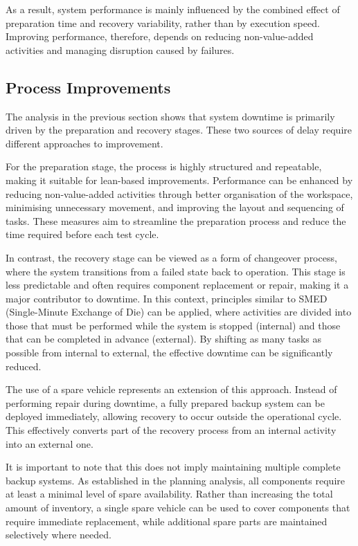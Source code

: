 \documentclass[11pt, a4paper]{report}
\numberwithin{equation}{section}
\begin{document}
As a result, system performance is mainly influenced by the combined effect of preparation time and recovery variability, rather than by execution speed. Improving performance, therefore, depends on reducing non-value-added activities and managing disruption caused by failures.

\subsection{Process Improvements}

The analysis in the previous section shows that system downtime is primarily driven by the preparation and recovery stages. These two sources of delay require different approaches to improvement.

For the preparation stage, the process is highly structured and repeatable, making it suitable for lean-based improvements. Performance can be enhanced by reducing non-value-added activities through better organisation of the workspace, minimising unnecessary movement, and improving the layout and sequencing of tasks. These measures aim to streamline the preparation process and reduce the time required before each test cycle.

In contrast, the recovery stage can be viewed as a form of changeover process, where the system transitions from a failed state back to operation. This stage is less predictable and often requires component replacement or repair, making it a major contributor to downtime. In this context, principles similar to SMED (Single-Minute Exchange of Die) can be applied, where activities are divided into those that must be performed while the system is stopped (internal) and those that can be completed in advance (external). By shifting as many tasks as possible from internal to external, the effective downtime can be significantly reduced.

The use of a spare vehicle represents an extension of this approach. Instead of performing repair during downtime, a fully prepared backup system can be deployed immediately, allowing recovery to occur outside the operational cycle. This effectively converts part of the recovery process from an internal activity into an external one.

It is important to note that this does not imply maintaining multiple complete backup systems. As established in the planning analysis, all components require at least a minimal level of spare availability. Rather than increasing the total amount of inventory, a single spare vehicle can be used to cover components that require immediate replacement, while additional spare parts are maintained selectively where needed.
\end{document}
